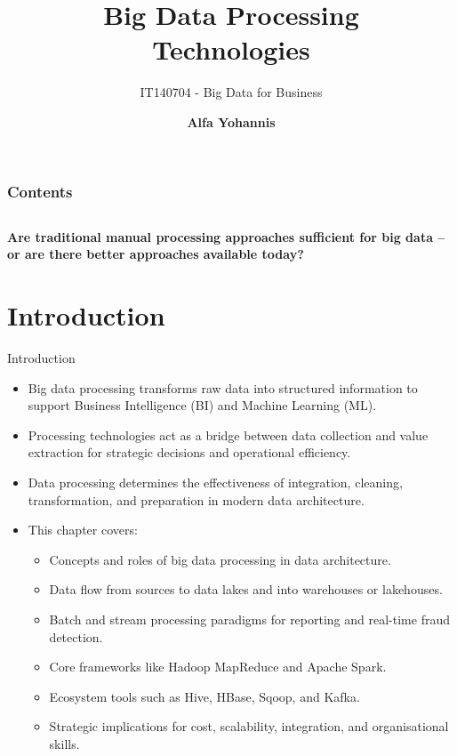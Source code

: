 \documentclass[aspectratio=169, table]{beamer}
\title{\Huge Big Data Processing \\
\vspace{10pt}
Technologies}
\subtitle{IT140704 - Big Data for Business}
\author{\textbf{Alfa Yohannis}}
\begin{document}
\frame{\titlepage}


\begin{frame}[fragile]
\frametitle{Contents}
\vspace{20pt}
\begin{columns}[t]
	\tableofcontents[sections={1-7}]
	
	\tableofcontents[sections={8-20}]
\end{columns}
\end{frame}


\begin{frame}{\hfill}
	\centering
	\Huge{\textbf{Are traditional manual processing approaches sufficient for big data – or are there better approaches available today?}}
\end{frame}





\section{Introduction}

\begin{frame}{Introduction}
	\vspace{20pt}
	
	\begin{itemize}
		\item Big data processing transforms raw data into structured information to support Business Intelligence (BI) and Machine Learning (ML).
		
		\item Processing technologies act as a bridge between data collection and value extraction for strategic decisions and operational efficiency.
		
		\item Data processing determines the effectiveness of integration, cleaning, transformation, and preparation in modern data architecture.
		
		\item This chapter covers:
		\begin{itemize}
			\item Concepts and roles of big data processing in data architecture.
			\item Data flow from sources to data lakes and into warehouses or lakehouses.
			\item Batch and stream processing paradigms for reporting and real-time fraud detection.
			\item Core frameworks like Hadoop MapReduce and Apache Spark.
			\item Ecosystem tools such as Hive, HBase, Sqoop, and Kafka.
			\item Strategic implications for cost, scalability, integration, and organisational skills.
		\end{itemize}
	\end{itemize}
	
\end{frame}
\end{document}
